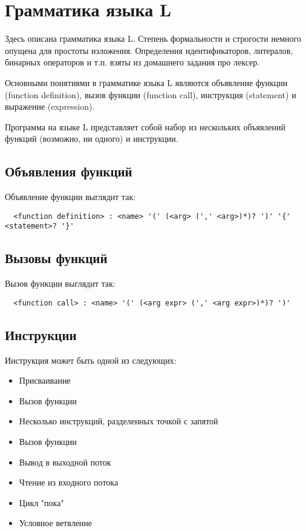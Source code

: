 \documentclass{amsart}
\begin{document}
  \section{Грамматика языка L}

  Здесь описана грамматика языка L. Степень формальности и строгости немного опущена для простоты изложения.
  Определения идентификаторов, литералов, бинарных операторов и т.п. взяты из домашнего задания про лексер.

  Основными понятиями в грамматике языка L являются объявление функции (function definition), вызов функции (function 
  call), инструкция (statement) и выражение (expression).

  Программа на языке L представляет собой набор из нескольких объявлений функций (возможно, ни одного) и инструкции.
    
  \subsection{Объявления функций}
  Объявление функции выглядит так:

  \begin{lstlisting}
  <function definition> : <name> '(' (<arg> (',' <arg>)*)? ')' '{' <statement>? '}'
  \end{lstlisting}

  \subsection{Вызовы функций}
  Вызов функции выглядит так:

  \begin{lstlisting}
  <function call> : <name> '(' (<arg expr> (',' <arg expr>)*)? ')'
  \end{lstlisting}


  \subsection{Инструкции}
  Инструкция может быть одной из следующих:

  \begin{itemize}
      \item Присваивание
      \item Вызов функции
      \item Несколько инструкций, разделенных точкой с запятой
      \item Вызов функции
      \item Вывод в выходной поток
      \item Чтение из входного потока
      \item Цикл "пока"
      \item Условное ветвление
  \end{itemize}
\end{document}

